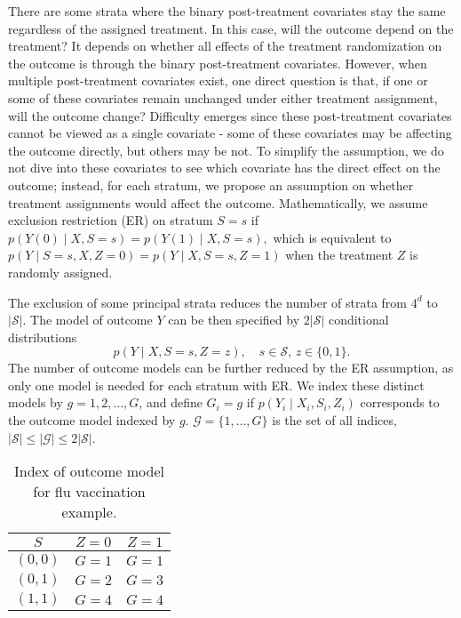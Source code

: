 \documentclass{article}
\begin{document}
There are some strata where the binary post-treatment covariates stay the same regardless of the assigned treatment. In this case, will the outcome depend on the treatment? It depends on whether all effects of the treatment randomization on the outcome is through the binary post-treatment covariates. However, when multiple  post-treatment covariates exist, one direct question is that, if one or some of these covariates remain unchanged under either treatment assignment, will the outcome change? Difficulty emerges since these post-treatment covariates cannot be viewed as a single covariate - some of these covariates may be affecting the outcome directly, but others may be not. To simplify the assumption, we do not dive into these covariates to see which covariate has the direct effect on the outcome; instead, for each stratum, we propose an assumption on whether treatment assignments would affect the outcome. Mathematically, we assume exclusion restriction (ER) on stratum $S=s$ if $p(Y(0)\mid X, S=s) = p(Y(1) \mid X, S = s),$ which is equivalent to $p(Y\mid S = s, X, Z = 0) = p(Y \mid X, S = s, Z = 1)$ when the treatment $Z$ is randomly assigned.

The exclusion of some principal strata reduces the number of strata from $4^d$ to $|\mathcal{S}|$. The model of outcome $Y$ can be then specified by $2|\mathcal{S}|$ conditional distributions $$p(Y \mid X, S = s, Z = z), \quad s\in\mathcal{S}, \,z\in\{0, 1\}.$$ The number of outcome models can be further reduced by the ER assumption, as only one model is needed for each stratum with ER. We index these distinct models by $g = 1, 2, \dots, G$, and define $G_i = g$ if $p(Y_i\mid X_i, S_i, Z_i)$ corresponds to the outcome model indexed by $g$. $\mathcal{G} = \{1,\dots, G\}$ is the set of all indices, $|\mathcal{S}|\leq |\mathcal{G}| \leq 2|\mathcal{S}|$.

\begin{table}[h]
  \centering
  \begin{tabular}{ccc}
    \toprule 
    $S$ & $Z = 0$ & $Z = 1$ \\
    \midrule
    $(0, 0)$ & $G = 1$ & $G = 1$ \\
    $(0, 1)$ & $G = 2$ & $G = 3$ \\
    $(1, 1)$ & $G = 4$ & $G = 4$ \\
    \bottomrule
  \end{tabular}
  \caption{Index of outcome model for flu vaccination example.}
  \label{tbl::fluvac}
\end{table}
\end{document}
